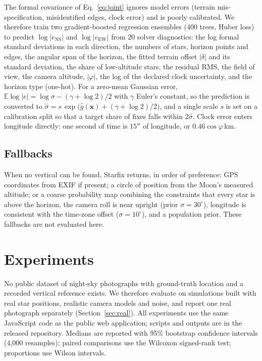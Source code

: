 \documentclass[11pt,a4paper]{article}
\begin{document}
The formal covariance of Eq.~\eqref{eq:joint} ignores model errors (terrain mis-specification, misidentified edges, clock error) and is poorly calibrated. We therefore train two gradient-boosted regression ensembles \citep{friedman2001gbm} (400 trees, Huber loss) to predict $\log|e_{\mathrm{NS}}|$ and $\log|e_{\mathrm{EW}}|$ from 20 solver diagnostics: the log formal standard deviations in each direction, the numbers of stars, horizon points and edges, the angular span of the horizon, the fitted terrain offset $|\delta|$ and its standard deviation, the share of low-altitude stars, the residual RMS, the field of view, the camera altitude, $|\varphi|$, the log of the declared clock uncertainty, and the horizon type (one-hot). For a zero-mean Gaussian error, $\mathbb{E}\log|e| = \log\sigma - (\gamma+\log 2)/2$ with $\gamma$ Euler's constant, so the prediction is converted to $\hat\sigma = s\,\exp\!\big(\hat g(\bm{x}) + (\gamma+\log2)/2\big)$, and a single scale $s$ is set on a calibration split so that a target share of fixes falls within $2\hat\sigma$. Clock error enters longitude directly: one second of time is $15''$ of longitude, or $0.46\cos\varphi$\,km.

\subsection{Fallbacks}

When no vertical can be found, Starfix returns, in order of preference: GPS coordinates from EXIF if present; a circle of position from the Moon's measured altitude; or a coarse probability map combining the constraints that every star is above the horizon, the camera roll is near upright (prior $\sigma=30^\circ$), longitude is consistent with the time-zone offset ($\sigma=10^\circ$), and a population prior. These fallbacks are not evaluated here.

\section{Experiments}
\label{sec:experiments}

No public dataset of night-sky photographs with ground-truth location and a recorded vertical reference exists. We therefore evaluate on simulations built with real star positions, realistic camera models and noise, and report one real photograph separately (Section~\ref{sec:real}). All experiments use the same JavaScript code as the public web application; scripts and outputs are in the released repository. Medians are reported with 95\% bootstrap confidence intervals (4{,}000 resamples); paired comparisons use the Wilcoxon signed-rank test; proportions use Wilson intervals.
\end{document}
